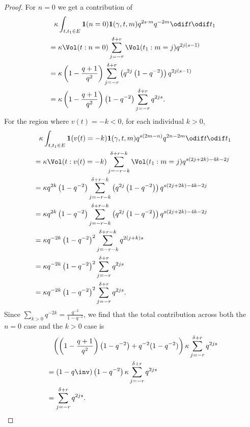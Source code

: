\begin{proof}
  For $n = 0$ we get a contribution of
  \begin{align*}
    &\phantom= \kappa \int_{t, t_1 \in E} \mathbf{1}(n=0) \mathbf{1}(\gamma,t,m)
      q^{2s \cdot m} q^{-2m} \odif t \odif t_1 \\
    &= \kappa \Vol(t: n =0) \sum_{j=-r}^{\delta+r} \Vol(t_1: m=j) q^{2j(s-1)} \\
    &= \kappa \left( 1 - \frac{q+1}{q^2} \right) \sum_{j=-r}^{\delta+r}
    \left( q^{2j} \left( 1-q^{-2} \right) \right) q^{2j(s-1)} \\
    &= \kappa \left( 1 - \frac{q+1}{q^2} \right) \left( 1-q^{-2} \right)
    \sum_{j=-r}^{\delta+r} q^{2js}.
  \end{align*}
  For the region where $v(t) = -k < 0$, for each individual $k > 0$,
  \begin{align*}
    &\phantom= \kappa \int_{t, t_1 \in E} \mathbf{1}(v(t)=-k) \mathbf{1}(\gamma,t,m)
      q^{s(2m-n)} q^{2n-2m} \odif t \odif t_1 \\
    &= \kappa \Vol(t: v(t)=-k) \sum_{j=-r-k}^{\delta+r-k}
      \Vol(t_1: m=j) q^{s(2j+2k)-4k-2j} \\
    &= \kappa q^{2k} \left( 1 - q^{-2} \right) \sum_{j=-r-k}^{\delta+r-k}
      \left( q^{2j} \left( 1-q^{-2} \right) \right) q^{s(2j+2k)-4k-2j} \\
    &= \kappa q^{2k} \left( 1 - q^{-2} \right) \sum_{j=-r-k}^{\delta+r-k}
      \left( q^{2j} \left( 1-q^{-2} \right) \right) q^{s(2j+2k)-4k-2j} \\
    &= \kappa q^{-2k} \left( 1 - q^{-2} \right)^2
      \sum_{j=-r-k}^{\delta+r-k} q^{2(j+k)s} \\
    &= \kappa q^{-2k} \left( 1 - q^{-2} \right)^2 \sum_{j=-r}^{\delta+r} q^{2js} \\
    &= \kappa q^{-2k} \left( 1 - q^{-2} \right)^2 \sum_{j=-r}^{\delta+r} q^{2js}.
  \end{align*}
  Since $\sum_{k > 0} q^{-2k} = \frac{q^{-2}}{1-q^{-2}}$,
  we find that the total contribution across both
  the $n=0$ case and the $k > 0$ case is
  \begin{align*}
    &\phantom= \left( \left( 1 - \frac{q+1}{q^2} \right) \left( 1-q^{-2} \right)
      + q^{-2}(1-q^{-2})  \right) \kappa \sum_{j=-r}^{\delta+r} q^{2js} \\
    &= \left( 1-q\inv \right) \left(1-q^{-2} \right)
      \kappa \sum_{j=-r}^{\delta+r} q^{2js} \\
    &= \sum_{j=-r}^{\delta+r} q^{2js}. \qedhere
  \end{align*}
\end{proof}

